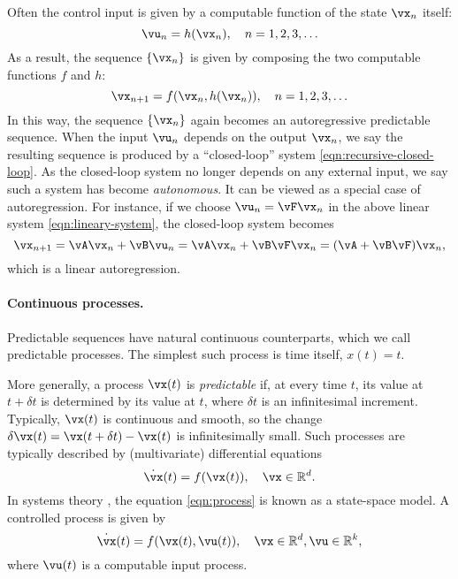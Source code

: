 \documentclass[../../book-main.tex]{subfiles}
\begin{document}
Often the control input is given by a computable function of the state \(\vx_{n}\) itself: 
\begin{equation}
    \vu_{n} = h(\vx_{n}), \quad n = 1, 2, 3, \ldots 
    \label{eqn:control-function}
\end{equation}
As a result, the sequence \(\{\vx_{n}\}\) is given by composing the two computable functions \(f\) and \(h\):
\begin{equation}
    \vx_{n+1} = f(\vx_{n}, h(\vx_{n})), \quad n = 1, 2, 3, \ldots
    \label{eqn:recursive-closed-loop}
\end{equation}
In this way, the sequence \(\{\vx_{n}\}\) again becomes an autoregressive predictable sequence. When the input \(\vu_{n}\) depends on the output \(\vx_{n}\), we say the resulting sequence is produced by a ``closed-loop'' system \eqref{eqn:recursive-closed-loop}. As the closed-loop system no longer depends on any external input, we say such a system has become \textit{autonomous}. It can be viewed as a special case of autoregression. For instance, if we choose \(\vu_{n} = \vF\vx_{n}\) in the above linear system \eqref{eqn:lineary-system}, the closed-loop system becomes
\begin{equation}
    \vx_{n+1} = \vA\vx_{n} + \vB\vu_{n} = \vA\vx_{n} + \vB\vF\vx_{n} = (\vA + \vB\vF)\vx_{n},
    \label{eqn:lineary-system-closed}
\end{equation}
which is a linear autoregression.


\paragraph{Continuous processes.}
Predictable sequences have natural continuous counterparts, which we call predictable processes. The simplest such process is time itself, \(x(t) = t\).

More generally, a process \(\vx(t)\) is \textit{predictable} if, at every time \(t\), its value at \(t + \delta t\) is determined by its value at \(t\), where \(\delta t\) is an infinitesimal increment. Typically, \(\vx(t)\) is continuous and smooth, so the change \(\delta \vx(t) = \vx(t + \delta t) - \vx(t)\) is infinitesimally small. Such processes are typically described by (multivariate) differential equations
\begin{equation}
    \dot{\vx}(t) = f(\vx(t)), \quad \vx \in \R^{d}.
    \label{eqn:process}
\end{equation}
In systems theory \cite{Cal:Des,Sastry-Nonlinear}, the equation \eqref{eqn:process} is known as a state-space model. A controlled process is given by
\begin{equation}
    \dot{\vx}(t) = f(\vx(t), \vu(t)), \quad \vx \in \R^{d}, \vu \in \R^{k},
    \label{eqn:process-controlled}
\end{equation}
where \(\vu(t)\) is a computable input process.
\end{document}

